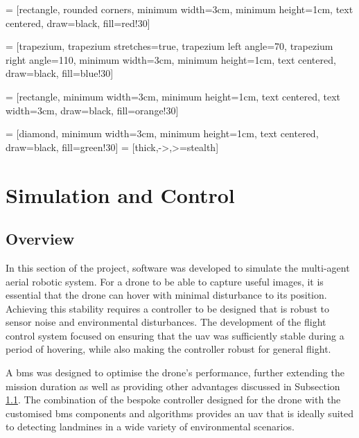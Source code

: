 \usetikzlibrary{shapes.geometric, arrows}

 = [rectangle, rounded corners, 
minimum width=3cm, 
minimum height=1cm,
text centered, 
draw=black, 
fill=red!30]

 = [trapezium, 
trapezium stretches=true, %
trapezium left angle=70, 
trapezium right angle=110, 
minimum width=3cm, 
minimum height=1cm, text centered, 
draw=black, fill=blue!30]

 = [rectangle, 
minimum width=3cm, 
minimum height=1cm, 
text centered, 
text width=3cm, 
draw=black, 
fill=orange!30]

 = [diamond, 
minimum width=3cm, 
minimum height=1cm, 
text centered, 
draw=black, 
fill=green!30]
 = [thick,->,>=stealth]



\section{Simulation and Control}

\subsection{Overview}

In this section of the project, software was developed to simulate the multi-agent aerial robotic system. For a drone to be able to capture useful images, it is essential that the drone can hover with minimal disturbance to its position. Achieving this stability requires a controller to be designed that is robust to sensor noise and environmental disturbances. The development of the flight control system focused on ensuring that the \gls{uav} was sufficiently stable during a period of hovering, while also making the controller robust for general flight.

A \gls{bms} was designed to optimise the drone's performance, further extending the mission duration as well as providing other advantages discussed in Subsection \ref{}. The combination of the bespoke controller designed for the drone with the customised \gls{bms} components and algorithms provides an \gls{uav} that is ideally suited to detecting landmines in a wide variety of environmental scenarios.


